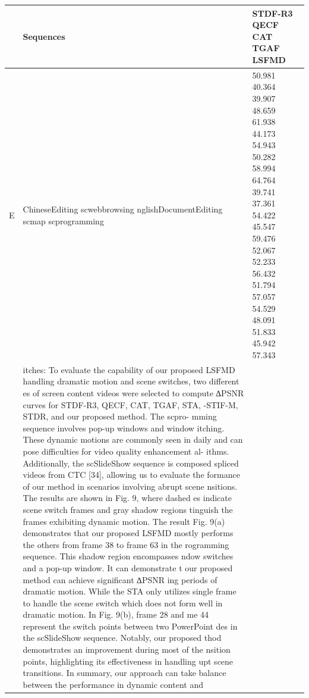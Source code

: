 \begin{tabular}{lll}
\toprule
 & Sequences & STDF-R3 QECF CAT TGAF LSFMD \\
\midrule
E & ChineseEditing scwebbrowsing nglishDocumentEditing scmap scprogramming & 50.981 40.364 39.907 48.659 61.938 44.173 54.943 50.282 58.994 64.764 39.741 37.361 54.422 45.547 59.476 52.067 52.233 56.432 51.794 57.057 54.529 48.091 51.833 45.942 57.343 \\
 & itches: To evaluate the capability of our proposed LSFMD handling dramatic motion and scene switches, two different es of screen content videos were selected to compute ∆PSNR curves for STDF-R3, QECF, CAT, TGAF, STA, -STIF-M, STDR, and our proposed method. The scpro- mming sequence involves pop-up windows and window itching. These dynamic motions are commonly seen in daily and can pose difficulties for video quality enhancement al- ithms. Additionally, the scSlideShow sequence is composed spliced videos from CTC [34], allowing us to evaluate the formance of our method in scenarios involving abrupt scene nsitions. The results are shown in Fig. 9, where dashed es indicate scene switch frames and gray shadow regions tinguish the frames exhibiting dynamic motion. The result Fig. 9(a) demonstrates that our proposed LSFMD mostly performs the others from frame 38 to frame 63 in the rogramming sequence. This shadow region encompasses ndow switches and a pop-up window. It can demonstrate t our proposed method can achieve significant ∆PSNR ing periods of dramatic motion. While the STA only utilizes single frame to handle the scene switch which does not form well in dramatic motion. In Fig. 9(b), frame 28 and me 44 represent the switch points between two PowerPoint des in the scSlideShow sequence. Notably, our proposed thod demonstrates an improvement during most of the nsition points, highlighting its effectiveness in handling upt scene transitions. In summary, our approach can take balance between the performance in dynamic content and &  \\
\bottomrule
\end{tabular}

